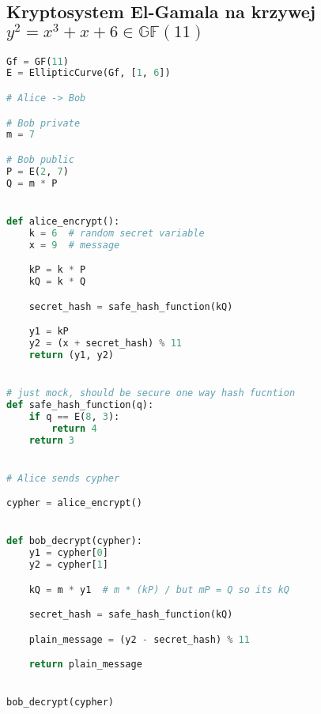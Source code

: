 \subsection{Kryptosystem El-Gamala na krzywej $y^2 = x^3 + x + 6 \in \mathbb{GF}(11)$ }
\begin{lstlisting}[language=python]
Gf = GF(11)
E = EllipticCurve(Gf, [1, 6])

# Alice -> Bob

# Bob private
m = 7

# Bob public
P = E(2, 7)
Q = m * P


def alice_encrypt():
    k = 6  # random secret variable
    x = 9  # message

    kP = k * P
    kQ = k * Q

    secret_hash = safe_hash_function(kQ)

    y1 = kP
    y2 = (x + secret_hash) % 11
    return (y1, y2)


# just mock, should be secure one way hash fucntion
def safe_hash_function(q):
    if q == E(8, 3):
        return 4
    return 3


# Alice sends cypher

cypher = alice_encrypt()


def bob_decrypt(cypher):
    y1 = cypher[0]
    y2 = cypher[1]

    kQ = m * y1  # m * (kP) / but mP = Q so its kQ

    secret_hash = safe_hash_function(kQ)

    plain_message = (y2 - secret_hash) % 11

    return plain_message


bob_decrypt(cypher)
\end{lstlisting}



